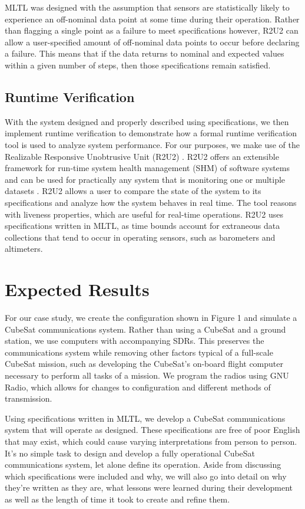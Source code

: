 \documentclass[conf]{new-aiaa}
\begin{document}
MLTL was designed with the assumption that sensors are statistically likely to experience an off-nominal data point at some time during their operation. Rather than flagging a single point as a failure to meet specifications however, R2U2 can allow a user-specified amount of off-nominal data points to occur before declaring a failure. This means that if the data returns to nominal and expected values within a given number of steps, then those specifications remain satisfied.

\subsection{Runtime Verification}

With the system designed and properly described using specifications, we then implement runtime verification to demonstrate how a formal runtime verification tool is used to analyze system performance. For our purposes, we make use of the Realizable Responsive Unobtrusive Unit (R2U2) \cite{ARS17}. R2U2 offers an extensible framework for run-time system health management (SHM) of software systems and can be used for practically any system that is monitoring one or multiple datasets \cite{MRS17,ARS17}. R2U2 allows a user to compare the state of the system to its specifications and analyze how the system behaves in real time. The tool reasons with liveness properties, which are useful for real-time operations. R2U2 uses specifications written in MLTL, as time bounds account for extraneous data collections that tend to occur in operating sensors, such as barometers and altimeters.

\section{Expected Results}

For our case study, we create the configuration shown in Figure 1 and simulate a CubeSat communications system. Rather than using a CubeSat and a ground station, we use computers with accompanying SDRs. This preserves the communications system while removing other factors typical of a full-scale CubeSat mission, such as developing the CubeSat's on-board flight computer necessary to perform all tasks of a mission. We program the radios using GNU Radio, which allows for changes to configuration and different methods of transmission.

Using specifications written in MLTL, we develop a CubeSat communications system that will operate as designed. These specifications are free of poor English that may exist, which could cause varying interpretations from person to person. It's no simple task to design and develop a fully operational CubeSat communications system, let alone define its operation. Aside from discussing which specifications were included and why, we will also go into detail on why they're written as they are, what lessons were learned during their development as well as the length of time it took to create and refine them.
\end{document}
